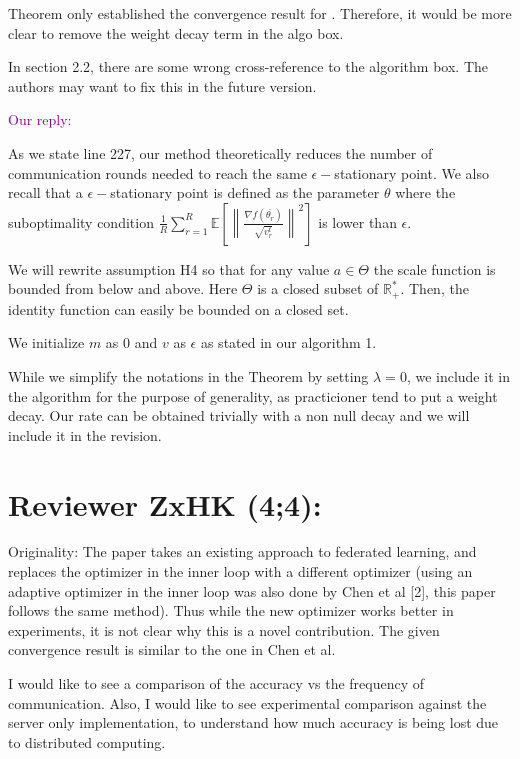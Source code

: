 \documentclass{article}
\begin{document}
Theorem only established the convergence result for . Therefore, it would be more clear to remove the weight decay term in the algo box.

In section 2.2, there are some wrong cross-reference to the algorithm box. The authors may want to fix this in the future version.

\textcolor{purple}{Our reply:}

As we state line 227, our method theoretically reduces the number of communication rounds needed to reach the same $\epsilon-$stationary point. We also recall that a $\epsilon-$stationary point is defined as the parameter $\theta$ where the suboptimality condition $ \frac{1}{R}\sum_{r=1}^R  \mathbb{E}\left[ \left\| \frac{\nabla f(\overline{\theta_r})}{\sqrt{ v_r^t}}   \right \|^2 \right]  $ is lower than $\epsilon$. 

We will rewrite assumption H4 so that for any value $a \in \Theta$ the scale function is bounded from below and above. Here $\Theta$ is a closed subset of $\mathbb{R}^*_+$. Then, the identity function can easily be bounded on a closed set.

We initialize $m$ as $0$ and $v$ as $\epsilon$ as stated in our algorithm 1.

While we simplify the notations in the Theorem by setting $\lambda = 0$, we include it in the algorithm for the purpose of generality, as practicioner tend to put a weight decay. Our rate can be obtained trivially with a non null decay and we will include it in the revision.


\section{Reviewer ZxHK (4;4):}

Originality: The paper takes an existing approach to federated learning, and replaces the optimizer in the inner loop with a different optimizer (using an adaptive optimizer in the inner loop was also done by Chen et al [2], this paper follows the same method). Thus while the new optimizer works better in experiments, it is not clear why this is a novel contribution. The given convergence result is similar to the one in Chen et al.

I would like to see a comparison of the accuracy vs the frequency of communication. Also, I would like to see experimental comparison against the server only implementation, to understand how much accuracy is being lost due to distributed computing.
\end{document}
